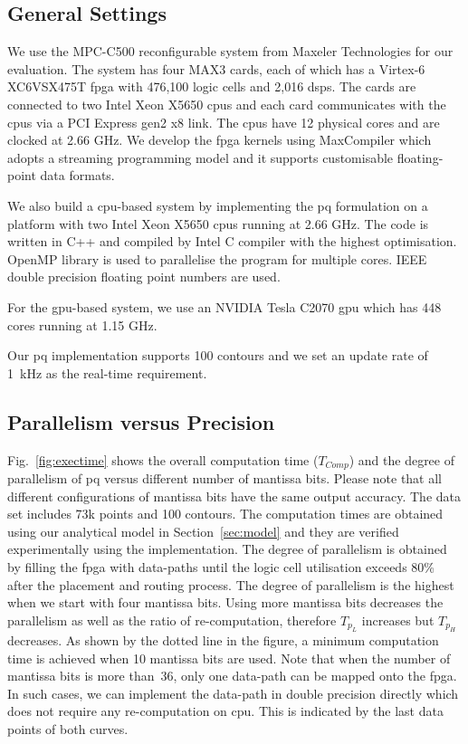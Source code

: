 \subsection{General Settings}
We use the MPC-C500 reconfigurable system from Maxeler Technologies for our evaluation.
The system has four MAX3 cards, each of which has a Virtex-6 XC6VSX475T \gls{fpga} with 476,100 logic cells and 2,016 \glspl{dsp}.
The cards are connected to two Intel Xeon X5650 \gls{cpu}s and each card communicates with the \gls{cpu}s via a PCI Express gen2 x8 link. 
The \gls{cpu}s have 12 physical cores and are clocked at 2.66 GHz.
We develop the \gls{fpga} kernels using MaxCompiler which adopts a streaming programming model and it supports customisable floating-point data formats.

We also build a \gls{cpu}-based system by implementing the \gls{pq} formulation on a platform with two Intel Xeon X5650 \gls{cpu}s running at 2.66 GHz.
The code is written in C++ and compiled by Intel C compiler with the highest optimisation.
OpenMP library is used to parallelise the program for multiple cores.
IEEE double precision floating point numbers are used.

For the \gls{gpu}-based system, we use an NVIDIA Tesla C2070 \gls{gpu} which has 448 cores running at 1.15 GHz.

Our \gls{pq} implementation supports 100 contours and we set an update rate of 1~kHz as the real-time requirement.

\subsection{Parallelism versus Precision}
\label{sec:parallelism}

Fig.~\ref{fig:exectime} shows the overall computation time ($T_{Comp}$)
and the degree of parallelism of \gls{pq} versus different number of mantissa bits.
Please note that all different configurations of mantissa bits have the same output accuracy.
The data set includes 73k points and 100 contours.
The computation times are obtained using our analytical model in Section~\ref{sec:model} and they are verified experimentally using the implementation.
The degree of parallelism is obtained by filling the \gls{fpga} with data-paths until the logic cell utilisation exceeds 80\% after the placement and routing process.
The degree of parallelism is the highest when we start with four mantissa bits.
Using more mantissa bits decreases the parallelism as well as the ratio of re-computation, therefore $T_{p_L}$ increases but $T_{p_H}$ decreases.
As shown by the dotted line in the figure, a minimum computation time is achieved when 10 mantissa bits are used.
Note that when the number of mantissa bits is more than~36, only one data-path can be mapped onto the \gls{fpga}.
In such cases, we can implement the data-path in double precision directly which does not require any re-computation on \gls{cpu}.
This is indicated by the last data points of both curves.

